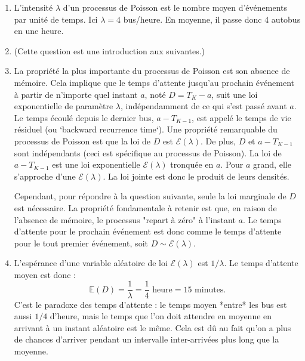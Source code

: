 \documentclass[solutions]{exercices}
\begin{document}
\begin{solution}
\begin{enumerate}
    \item L'intensité $\lambda$ d'un processus de Poisson est le nombre moyen d'événements par unité de temps. Ici $\lambda=4$ bus/heure. En moyenne, il passe donc 4 autobus en une heure.
    \item (Cette question est une introduction aux suivantes.)
    \item La propriété la plus importante du processus de Poisson est son absence de mémoire. Cela implique que le temps d'attente jusqu'au prochain événement à partir de n'importe quel instant $a$, noté $D=T_K-a$, suit une loi exponentielle de paramètre $\lambda$, indépendamment de ce qui s'est passé avant $a$. 
    Le temps écoulé depuis le dernier bus, $a-T_{K-1}$, est appelé le temps de vie résiduel (ou `backward recurrence time`). Une propriété remarquable du processus de Poisson est que la loi de $D$ est $\mathcal{E}(\lambda)$. De plus, $D$ et $a-T_{K-1}$ sont indépendants (ceci est spécifique au processus de Poisson). La loi de $a-T_{K-1}$ est une loi exponentielle $\mathcal{E}(\lambda)$ tronquée en $a$. Pour $a$ grand, elle s'approche d'une $\mathcal{E}(\lambda)$. La loi jointe est donc le produit de leurs densités.

    Cependant, pour répondre à la question suivante, seule la loi marginale de $D$ est nécessaire. La propriété fondamentale à retenir est que, en raison de l'absence de mémoire, le processus "repart à zéro" à l'instant $a$. Le temps d'attente pour le prochain événement est donc comme le temps d'attente pour le tout premier événement, soit $D \sim \mathcal{E}(\lambda)$.
    \item L'espérance d'une variable aléatoire de loi $\mathcal{E}(\lambda)$ est $1/\lambda$.
    Le temps d'attente moyen est donc :
    \[ \mathbb{E}(D) = \frac{1}{\lambda} = \frac{1}{4} \text{ heure} = 15 \text{ minutes}. \]
    C'est le paradoxe des temps d'attente : le temps moyen *entre* les bus est aussi $1/4$ d'heure, mais le temps que l'on doit attendre en moyenne en arrivant à un instant aléatoire est le même. Cela est dû au fait qu'on a plus de chances d'arriver pendant un intervalle inter-arrivées plus long que la moyenne.
\end{enumerate}
\end{solution}
\end{document}
